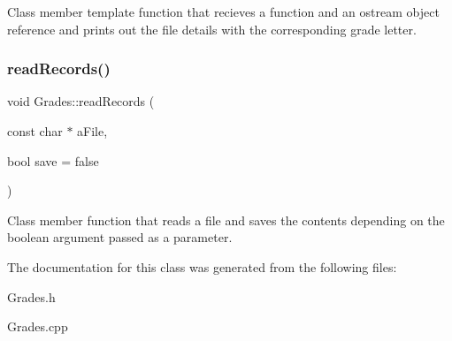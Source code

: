 Class member template function that recieves a function and an ostream object reference and prints out the file details with the corresponding grade letter. \mbox{\label{classGrades_aa2979504b1668bd2d28d70c76697dd4d}} 
\subsubsection{\texorpdfstring{read\+Records()}{readRecords()}}
{\footnotesize\ttfamily void Grades\+::read\+Records (\begin{DoxyParamCaption}\item[{const char $\ast$}]{a\+File,  }\item[{bool}]{save = {\ttfamily false} }\end{DoxyParamCaption})}

Class member function that reads a file and saves the contents depending on the boolean argument passed as a parameter. 

The documentation for this class was generated from the following files\+:\begin{DoxyCompactItemize}
\item 
Grades.\+h\item 
Grades.\+cpp\end{DoxyCompactItemize}
